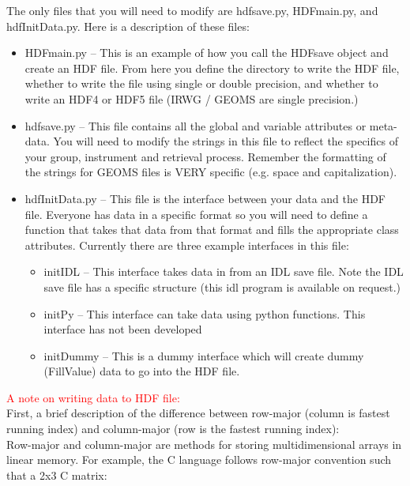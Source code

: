\documentclass[12pt, letterpaper]{article}
\begin{document}
The only files that you will need to modify are hdfsave.py, HDFmain.py, and hdfInitData.py. Here is a description of these files:

\begin{itemize}
\item HDFmain.py -- This is an example of how you call the HDFsave object and create an HDF file. From here you define the directory to write the HDF file, whether to write the file using single or double precision, and whether to write an HDF4 or HDF5 file (IRWG / GEOMS are single precision.)
\item hdfsave.py -- This file contains all the global and variable attributes or meta-data. You will need to modify the strings in this file to reflect the specifics of your group, instrument and retrieval process. Remember the formatting of the strings for GEOMS files is VERY specific (e.g. space and capitalization).
\item hdfInitData.py -- This file is the interface between your data and the HDF file. Everyone has data in a specific format so you will need to define a function that takes that data from that format and fills the appropriate class attributes. Currently there are three example interfaces in this file:
\begin{itemize}
\item initIDL -- This interface takes data in from an IDL save file. Note the IDL save file has a specific structure (this idl program is available on request.)
\item initPy  -- This interface can take data using python functions. This interface has not been developed
\item initDummy -- This is a dummy interface which will create dummy (FillValue) data to go into the HDF file.
\end{itemize}
\end{itemize} 

\textcolor{red}{A note on writing data to HDF file:}\\

First, a brief description of the difference between row-major (column is fastest running index) and column-major (row is the fastest running index):\\

Row-major and column-major are methods for storing multidimensional arrays in linear memory. For example, the C language follows row-major convention such that a 2x3 C matrix:\\
\end{document}

